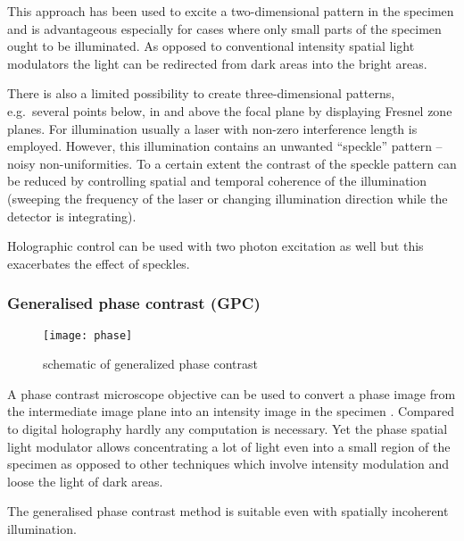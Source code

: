
This approach has been used to excite a two-dimensional pattern in the
specimen \citep{Lutz2008,Zahid2010} and is advantageous especially for
cases where only small parts of the specimen ought to be
illuminated. As opposed to conventional intensity spatial light
modulators the light can be redirected from dark areas into the bright
areas.

There is also a limited possibility to create three-dimensional
patterns, e.g.\ several points below, in and above the focal plane by
displaying Fresnel zone planes.  For illumination usually a laser with
non-zero interference length is employed. However, this illumination
contains an unwanted ``speckle'' pattern -- noisy non-uniformities. To
a certain extent the contrast of the speckle pattern can be reduced by
controlling spatial and temporal coherence of the illumination
(sweeping the frequency of the laser or changing illumination
direction while the detector is integrating).

Holographic control can be used with two photon excitation as well
\citep{Nikolenko2008} %
but this exacerbates the effect of speckles.
\subsubsection{Generalised phase contrast (GPC)}
\begin{figure}[!hbt]
  \centering
  \texttt{[image: phase]} %
  \caption{schematic of generalized phase contrast \citep{Rodrigo2008}}
  \label{fig:phase}
\end{figure}
A phase contrast microscope objective  can be used to
convert a phase image from the intermediate image plane into an
intensity image in the specimen \citep{Rodrigo2008}. Compared to digital holography hardly any computation is
necessary. Yet the phase spatial light modulator allows concentrating
a lot of light even into a small region of the specimen as opposed to
other techniques which involve intensity modulation and loose the
light of dark areas.

The generalised phase contrast method is suitable even with spatially
incoherent illumination.
